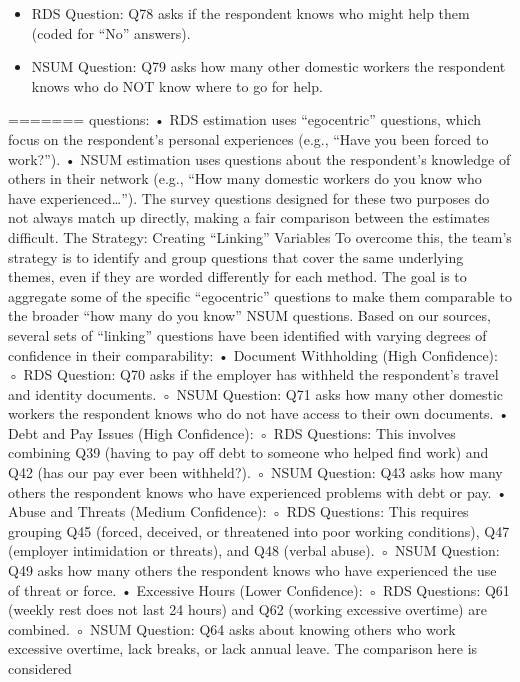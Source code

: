 \documentclass[
  12pt,
  letterpaper,
  DIV=11,
  numbers=noendperiod]{scrartcl}
\providecommand{\tightlist}{%
  \setlength{\itemsep}{0pt}\setlength{\parskip}{0pt}}
\theoremstyle{plain}
\theoremstyle{definition}
\begin{document}
{\begin{itemize}
  \begin{itemize}
  \tightlist
  \item
    RDS Question: Q78 asks if the respondent knows who might help them
    (coded for ``No'' answers).
  \item
    NSUM Question: Q79 asks how many other domestic workers the
    respondent knows who do NOT know where to go for help.
  \end{itemize}
\end{itemize}
=======
questions: • RDS estimation uses ``egocentric'' questions, which focus
on the respondent's personal experiences (e.g., ``Have you been forced
to work?''). • NSUM estimation uses questions about the respondent's
knowledge of others in their network (e.g., ``How many domestic workers
do you know who have experienced\ldots{}''). The survey questions
designed for these two purposes do not always match up directly, making
a fair comparison between the estimates difficult. The Strategy:
Creating ``Linking'' Variables To overcome this, the team's strategy is
to identify and group questions that cover the same underlying themes,
even if they are worded differently for each method. The goal is to
aggregate some of the specific ``egocentric'' questions to make them
comparable to the broader ``how many do you know'' NSUM questions. Based
on our sources, several sets of ``linking'' questions have been
identified with varying degrees of confidence in their comparability: •
Document Withholding (High Confidence): ◦ RDS Question: Q70 asks if the
employer has withheld the respondent's travel and identity documents. ◦
NSUM Question: Q71 asks how many other domestic workers the respondent
knows who do not have access to their own documents. • Debt and Pay
Issues (High Confidence): ◦ RDS Questions: This involves combining Q39
(having to pay off debt to someone who helped find work) and Q42 (has
our pay ever been withheld?). ◦ NSUM Question: Q43 asks how many others
the respondent knows who have experienced problems with debt or pay. •
Abuse and Threats (Medium Confidence): ◦ RDS Questions: This requires
grouping Q45 (forced, deceived, or threatened into poor working
conditions), Q47 (employer intimidation or threats), and Q48 (verbal
abuse). ◦ NSUM Question: Q49 asks how many others the respondent knows
who have experienced the use of threat or force. • Excessive Hours
(Lower Confidence): ◦ RDS Questions: Q61 (weekly rest does not last 24
hours) and Q62 (working excessive overtime) are combined. ◦ NSUM
Question: Q64 asks about knowing others who work excessive overtime,
lack breaks, or lack annual leave. The comparison here is considered
}
\end{document}
